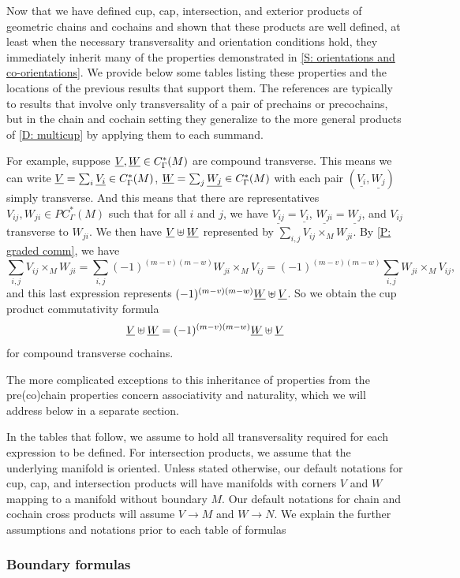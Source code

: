 Now that we have defined cup, cap, intersection, and exterior products of geometric chains and cochains and shown that these products are well defined, at least when the necessary transversality and orientation conditions hold, they immediately inherit many of the properties demonstrated in \cref{S: orientations and co-orientations}.
We provide below some tables listing these properties and the locations of the previous results that support them.
The references are typically to results that involve only transversality of a pair of prechains or precochains, but in the chain and cochain setting they generalize to the more general products of \cref{D: multicup} by applying them to each summand.

For example, suppose $\underline{V}, \underline{W} \in C^*_\Gamma(M)$ are compound transverse.
This means we can write $\underline{V} = \sum_i \underline{V_i} \in C_\Gamma^*(M)$, $\underline{W} = \sum_j \underline{W_j} \in C_\Gamma^*(M)$ with each pair $(\underline{V_i},\underline{W_j})$ simply transverse.
And this means that there are representatives $V_{ij},W_{ji} \in PC_\Gamma^*(M)$ such that for all $i$ and $j$, we have $\underline{V_{ij}} = \underline{V_i}$, $\underline{W_{ji}} = \underline{W_j}$, and $V_{ij}$ transverse to $W_{ji}$.
We then have $\underline{V}\uplus \underline{W}$ represented by
$\sum_{i,j} V_{ij} \times_M W_{ji}$.
By \cref{P: graded comm}, we have
$$\sum_{i,j} V_{ij} \times_M W_{ji} = \sum_{i,j} (-1)^{(m-v)(m-w)}W_{ji} \times_M V_{ij} = (-1)^{(m-v)(m-w)}\sum_{i,j} W_{ji} \times_M V_{ij},$$
and this last expression represents $(-1)^{(m-v)(m-w)} \underline{W}\uplus \underline{V}$.
So we obtain the cup product commutativity formula $$\underline{V}\uplus\underline{W} = (-1)^{(m-v)(m-w)}\underline{W}\uplus\underline{V}$$ for compound transverse cochains.

The more complicated exceptions to this inheritance of properties from the pre(co)chain properties concern associativity and naturality, which we will address below in a separate section.

In the tables that follow, we assume to hold all transversality required for each expression to be defined.
For intersection products, we assume that the underlying manifold is oriented.
Unless stated otherwise, our default notations for cup, cap, and intersection products will have manifolds with corners $V$ and $W$ mapping to a manifold without boundary $M$.
Our default notations for chain and cochain cross products will assume $V \to M$ and $W \to N$.
We explain the further assumptions and notations prior to each table of formulas

\subsubsection{Boundary formulas}

